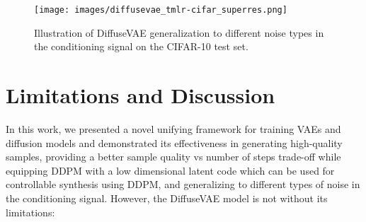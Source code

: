 \documentclass[10pt]{article} \usepackage[accepted]{tmlr}
\begin{document}
\begin{figure*}[t]
  \centering
    \texttt{[image: images/diffusevae\_tmlr-cifar\_superres.png]}
    \caption{Illustration of DiffuseVAE generalization to different noise types in the conditioning signal on the CIFAR-10 test set.}
    \label{fig:generalize}
\end{figure*}



\section{Limitations and Discussion}

In this work, we presented a novel unifying framework for training VAEs and diffusion models and demonstrated its effectiveness in generating high-quality samples, providing a better sample quality vs number of steps trade-off while equipping DDPM with a low dimensional latent code which can be used for controllable synthesis using DDPM, and generalizing to different types of noise in the conditioning signal. However, the DiffuseVAE model is not without its limitations:
\end{document}
